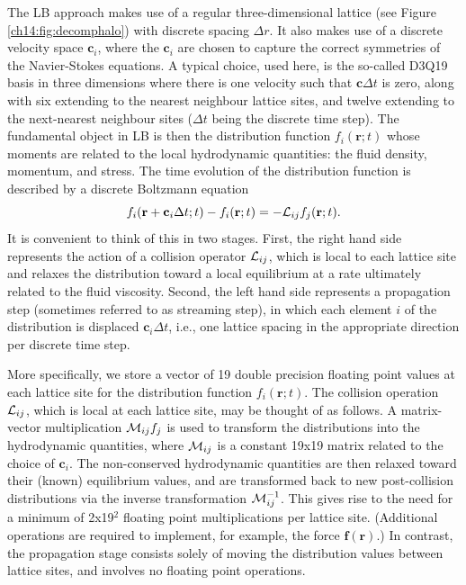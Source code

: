 The LB approach makes use of a regular three-dimensional
lattice (see Figure \ref{ch14:fig:decomphalo}) with discrete spacing
$\Delta r$. It also makes use of a
discrete velocity space $\mathbf{c}_i$, where the $\mathbf{c}_i$
are chosen to capture the correct symmetries of the Navier-Stokes
equations. A typical choice, used here, is the so-called D3Q19
basis in three dimensions where there is one velocity such that
$\mathbf{c} \Delta t$ is zero, along with six extending to the nearest
neighbour
lattice sites, and twelve extending to the next-nearest neighbour sites
($\Delta t$ being the discrete time step). The fundamental object
in LB is then the distribution function $f_i (\mathbf{r};t)$ whose
moments are related to the local hydrodynamic quantities: the fluid
density, momentum, and stress. The time evolution of the distribution
function is described by a discrete Boltzmann equation
\begin{equation}
f_i(\mathbf{r} + \mathbf{c}_i \Delta t; t) - f_i(\mathbf{r}; t) 
= - {\cal L}_{ij} f_j(\mathbf{r};t).
\end{equation}
It is convenient to think of this in two stages. First, the right hand
side represents the action of a collision operator ${\cal L}_{ij}$,
which is local to each lattice site and relaxes the distribution toward
a local equilibrium at a rate ultimately related to the fluid viscosity.
Second, the left hand side represents a propagation step (sometimes referred
to as streaming step), in which each element $i$ of the distribution is
displaced $\mathbf{c}_i \Delta t$, i.e., one lattice spacing in the
appropriate direction per discrete time step. 

More specifically, we store a vector of 19 double precision floating
point values at each lattice site for the distribution function
$f_i(\mathbf{r};t)$.
The collision operation ${\cal L}_{ij}$, which is local at each lattice
site, may be thought of as follows. A matrix-vector multiplication
${\cal M}_{ij}f_j$ is used to transform the distributions into the
hydrodynamic quantities, where ${\cal M}_{ij}$ is a constant 19x19
matrix related to the choice of
$\mathbf{c}_i$. The non-conserved hydrodynamic quantities are then
relaxed toward their (known) equilibrium values, and are transformed
back to new post-collision distributions via the inverse transformation
${\cal M}^{-1}_{ij}$. This gives rise to the need for a minimum of 2x19$^2$
floating point multiplications per lattice site. (Additional operations are
required to implement, for example, the force $\mathbf{f}(\mathbf{r})$.)
In contrast, the
propagation stage consists solely of moving the distribution values
between lattice sites, and involves no floating point operations.

